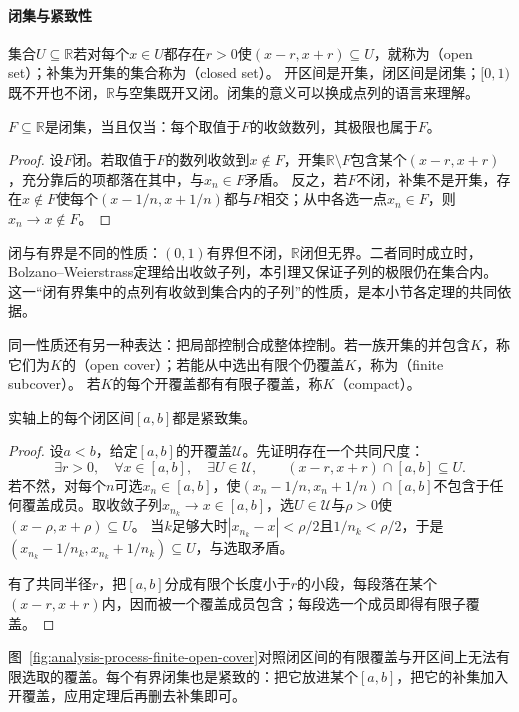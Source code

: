 \paragraph{闭集与紧致性}
集合$U\subseteq\mathbb R$若对每个$x\in U$都存在$r>0$使$(x-r,x+r)\subseteq U$，就称为（open set）；补集为开集的集合称为（closed set）。
开区间是开集，闭区间是闭集；$[0,1)$既不开也不闭，$\mathbb R$与空集既开又闭。闭集的意义可以换成点列的语言来理解。
\begin{lemma}[闭集的序列判据]
\label{lem:analysis-closed-sequence-criterion}
$F\subseteq\mathbb R$是闭集，当且仅当：每个取值于$F$的收敛数列，其极限也属于$F$。
\end{lemma}
\begin{proof}
设$F$闭。若取值于$F$的数列收敛到$x\notin F$，开集$\mathbb R\setminus F$包含某个$(x-r,x+r)$，充分靠后的项都落在其中，与$x_n\in F$矛盾。
反之，若$F$不闭，补集不是开集，存在$x\notin F$使每个$(x-1/n,x+1/n)$都与$F$相交；从中各选一点$x_n\in F$，则$x_n\to x\notin F$。
\end{proof}
闭与有界是不同的性质：$(0,1)$有界但不闭，$\mathbb R$闭但无界。二者同时成立时，Bolzano--Weierstrass定理给出收敛子列，本引理又保证子列的极限仍在集合内。
这一“闭有界集中的点列有收敛到集合内的子列”的性质，是本小节各定理的共同依据。

同一性质还有另一种表达：把局部控制合成整体控制。若一族开集的并包含$K$，称它们为$K$的（open cover）；若能从中选出有限个仍覆盖$K$，称为（finite subcover）。
若$K$的每个开覆盖都有有限子覆盖，称$K$（compact）。
\begin{theorem}[闭区间的有限子覆盖性质]
\label{thm:analysis-interval-finite-subcover}
实轴上的每个闭区间$[a,b]$都是紧致集。
\end{theorem}
\begin{proof}
设$a<b$，给定$[a,b]$的开覆盖$\mathcal U$。先证明存在一个共同尺度：
\begin{equation}
 \exists r>0,\quad\forall x\in[a,b],\quad\exists U\in\mathcal U,\qquad(x-r,x+r)\cap[a,b]\subseteq U.
 \label{eq:analysis-cover-uniform-radius}
\end{equation}
若不然，对每个$n$可选$x_n\in[a,b]$，使$(x_n-1/n,x_n+1/n)\cap[a,b]$不包含于任何覆盖成员。取收敛子列$x_{n_k}\to x\in[a,b]$，选$U\in\mathcal U$与$\rho>0$使$(x-\rho,x+\rho)\subseteq U$。
当$k$足够大时$|x_{n_k}-x|<\rho/2$且$1/n_k<\rho/2$，于是$(x_{n_k}-1/n_k,x_{n_k}+1/n_k)\subseteq U$，与选取矛盾。

有了共同半径$r$，把$[a,b]$分成有限个长度小于$r$的小段，每段落在某个$(x-r,x+r)$内，因而被一个覆盖成员包含；每段选一个成员即得有限子覆盖。
\end{proof}
图~\ref{fig:analysis-process-finite-open-cover}对照闭区间的有限覆盖与开区间上无法有限选取的覆盖。每个有界闭集也是紧致的：把它放进某个$[a,b]$，把它的补集加入开覆盖，应用定理后再删去补集即可。

